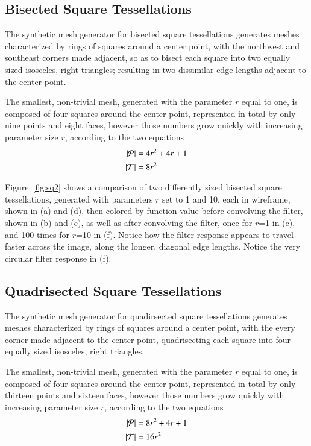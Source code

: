 %
%
%
%
\pagebreak
\subsection{Bisected Square Tessellations}
The synthetic mesh generator for bisected square tessellations generates meshes characterized by rings of squares around a center point, with the northwest and southeast corners made adjacent, so as to bisect each square into two equally sized isosceles, right triangles; resulting in two dissimilar edge lengths adjacent to the center point.

The smallest, non-trivial mesh, generated with the parameter $r$ equal to one, is composed of four squares around the center point, represented in total by only nine points and eight faces, however those numbers grow quickly with increasing parameter size $r$, according to the two equations
\begin{align}
	|\mathcal{P}| &= 4r^2 + 4r + 1 \\
	|\mathcal{T}| &= 8r^2
	\label{eq:sq2PointAndFaceCounts}
\end{align}

Figure~\ref{fig:sq2} shows a comparison of two differently sized bisected square tessellations, generated with parameters $r$ set to 1 and 10, each in wireframe, shown in (a) and (d), then colored by function value before convolving the filter, shown in (b) and (e), as well as after convolving the filter, once for $r$=1 in (c), and 100 times for $r$=10 in (f). Notice how the filter response appears to travel faster across the image, along the longer, diagonal edge lengths. Notice the very circular filter response in (f).



%
%
%
%
\pagebreak
\subsection{Quadrisected Square Tessellations}
The synthetic mesh generator for quadirsected square tessellations generates meshes characterized by rings of squares around a center point, with the every corner made adjacent to the center point, quadrisecting each square into four equally sized isosceles, right triangles.

The smallest, non-trivial mesh, generated with the parameter $r$ equal to one, is composed of four squares around the center point, represented in total by only thirteen points and sixteen faces, however those numbers grow quickly with increasing parameter size $r$, according to the two equations
\begin{align}
	|\mathcal{P}| &= 8r^2 + 4r + 1 \\
	|\mathcal{T}| &= 16r^2
	\label{eq:sq4PointAndFaceCounts}
\end{align}

